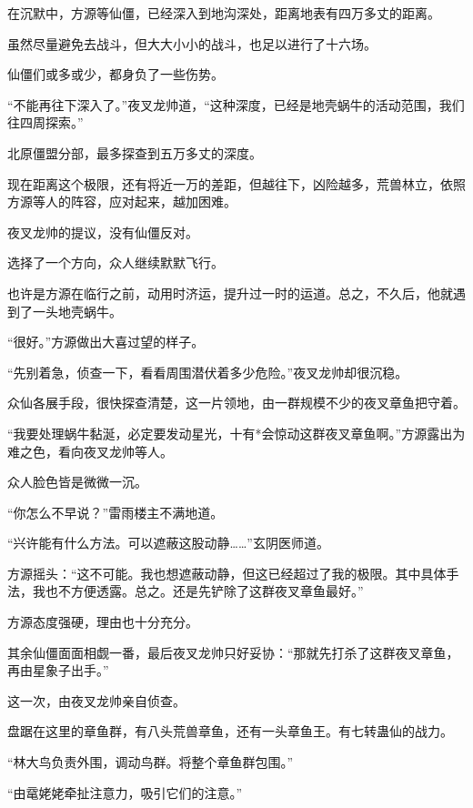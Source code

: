 
\begin{this_body}

在沉默中，方源等仙僵，已经深入到地沟深处，距离地表有四万多丈的距离。

虽然尽量避免去战斗，但大大小小的战斗，也足以进行了十六场。

仙僵们或多或少，都身负了一些伤势。

“不能再往下深入了。”夜叉龙帅道，“这种深度，已经是地壳蜗牛的活动范围，我们往四周探索。”

北原僵盟分部，最多探查到五万多丈的深度。

现在距离这个极限，还有将近一万的差距，但越往下，凶险越多，荒兽林立，依照方源等人的阵容，应对起来，越加困难。

夜叉龙帅的提议，没有仙僵反对。

选择了一个方向，众人继续默默飞行。

也许是方源在临行之前，动用时济运，提升过一时的运道。总之，不久后，他就遇到了一头地壳蜗牛。

“很好。”方源做出大喜过望的样子。

“先别着急，侦查一下，看看周围潜伏着多少危险。”夜叉龙帅却很沉稳。

众仙各展手段，很快探查清楚，这一片领地，由一群规模不少的夜叉章鱼把守着。

“我要处理蜗牛黏涎，必定要发动星光，十有*会惊动这群夜叉章鱼啊。”方源露出为难之色，看向夜叉龙帅等人。

众人脸色皆是微微一沉。

“你怎么不早说？”雷雨楼主不满地道。

“兴许能有什么方法。可以遮蔽这股动静……”玄阴医师道。

方源摇头：“这不可能。我也想遮蔽动静，但这已经超过了我的极限。其中具体手法，我也不方便透露。总之。还是先铲除了这群夜叉章鱼最好。”

方源态度强硬，理由也十分充分。

其余仙僵面面相觑一番，最后夜叉龙帅只好妥协：“那就先打杀了这群夜叉章鱼，再由星象子出手。”

这一次，由夜叉龙帅亲自侦查。

盘踞在这里的章鱼群，有八头荒兽章鱼，还有一头章鱼王。有七转蛊仙的战力。

“林大鸟负责外围，调动鸟群。将整个章鱼群包围。”

“由鼋姥姥牵扯注意力，吸引它们的注意。”


\end{this_body}
